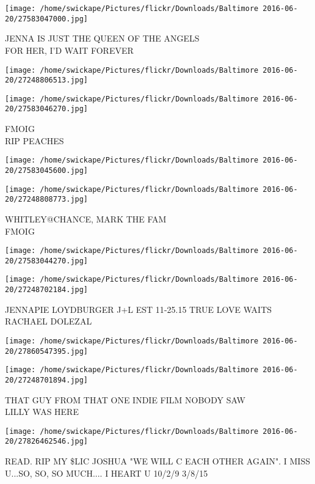 \documentclass[10pt,letterpaper]{article}
\begin{document}
\vspace{0.25in}
\texttt{[image: /home/swickape/Pictures/flickr/Downloads/Baltimore 2016-06-20/27583047000.jpg]}

JENNA IS JUST THE QUEEN OF THE ANGELS\\
FOR HER, I'D WAIT FOREVER
\pagebreak

\texttt{[image: /home/swickape/Pictures/flickr/Downloads/Baltimore 2016-06-20/27248806513.jpg]}

\vspace{0.25in}
\texttt{[image: /home/swickape/Pictures/flickr/Downloads/Baltimore 2016-06-20/27583046270.jpg]}

FMOIG\\
RIP PEACHES
\pagebreak

\texttt{[image: /home/swickape/Pictures/flickr/Downloads/Baltimore 2016-06-20/27583045600.jpg]}

\vspace{0.25in}
\texttt{[image: /home/swickape/Pictures/flickr/Downloads/Baltimore 2016-06-20/27248808773.jpg]}

WHITLEY@CHANCE, MARK THE FAM\\
FMOIG
\pagebreak

\texttt{[image: /home/swickape/Pictures/flickr/Downloads/Baltimore 2016-06-20/27583044270.jpg]}

\vspace{0.25in}
\texttt{[image: /home/swickape/Pictures/flickr/Downloads/Baltimore 2016-06-20/27248702184.jpg]}

JENNAPIE LOYDBURGER J+L EST 11{-}25.15 TRUE LOVE WAITS\\
RACHAEL DOLEZAL
\pagebreak

\texttt{[image: /home/swickape/Pictures/flickr/Downloads/Baltimore 2016-06-20/27860547395.jpg]}

\vspace{0.25in}
\texttt{[image: /home/swickape/Pictures/flickr/Downloads/Baltimore 2016-06-20/27248701894.jpg]}

THAT GUY FROM THAT ONE INDIE FILM NOBODY SAW\\
LILLY WAS HERE
\pagebreak

\texttt{[image: /home/swickape/Pictures/flickr/Downloads/Baltimore 2016-06-20/27826462546.jpg]}

READ.  RIP MY \$LIC JOSHUA "WE WILL C EACH OTHER AGAIN".  I MISS U...SO, SO, SO MUCH.... I HEART U 10/2/9 3/8/15
\pagebreak
\end{document}

